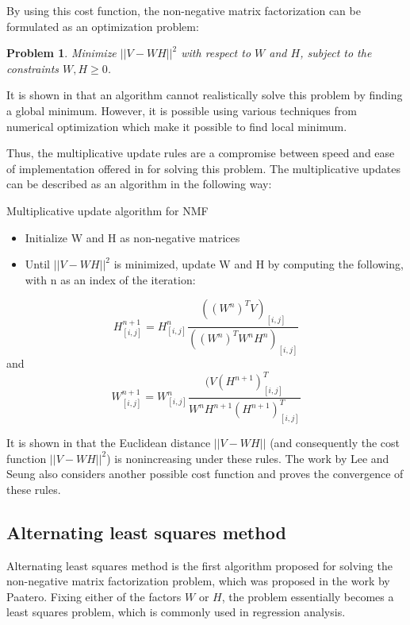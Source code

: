 \documentclass[thesis=M,english]{FITthesis}[2012/10/20]
\newtheorem{problem}{Problem}
\begin{document}
By using this cost function, the non-negative matrix factorization can be
formulated as an optimization problem:
\begin{problem}
  Minimize $||V - WH||^2$ with respect to $W$ and $H$, subject to the constraints
$W, H \geq 0$.
\end{problem}
It is shown in \cite{lee-algos} that an algorithm cannot realistically solve this
problem by finding a global minimum. However, it is possible using various
techniques from numerical optimization which make it possible to find
local minimum.

Thus, the multiplicative update rules are a compromise between speed and
ease of implementation offered in \cite{lee-algos} for solving this
problem. The multiplicative updates can be described as an algorithm in
the following way:

\begin{algorithm}[H]
  \caption{Multiplicative update algorithm for NMF}
  \begin{itemize}
    \item Initialize W and H as non-negative matrices\\
    \item Until $||V - WH||^2$ is minimized, update W and H by computing the
following, with n as an index of the iteration:\\
  \end{itemize}
  \begin{equation}
    H^{n+1}_{[i,j]} = H^{n}_{[i,j]} \frac{((W^{n})^TV)_{[i,j]}}{((W^{n})^{T}W^{n}H^{n})_{[i,j]}}
  \end{equation}
  and
  \begin{equation}
    W^{n+1}_{[i,j]} = W^{n}_{[i,j]} \frac{(V(H^{n+1})^{T}_{[i,j]}}{W^{n}H^{n+1}(H^{n+1})^{T}_{[i,j]}}
  \end{equation}
\end{algorithm}

It is shown in \cite{lee-algos} that the Euclidean distance $||V - WH||$ (and
consequently the cost function $||V - WH||^2$) is nonincreasing under these
rules. The work by Lee and Seung also considers another possible cost function and
proves the convergence of these rules.

\subsection{Alternating least squares method}
Alternating least squares method is the first algorithm proposed for solving
the non-negative matrix factorization problem, which was proposed in the
work by Paatero. \cite{nmf-paatero} Fixing either of the factors $W$ or $H$,
the problem essentially becomes a least squares problem, which is commonly
used in regression analysis.
\end{document}
